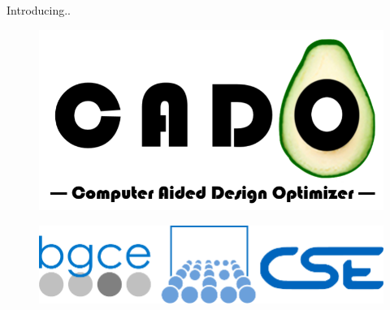 \begin{frame}{Introducing..}
	\begin{figure}
		\centering
		\includegraphics[scale=0.7]{Pictures/FirstHalf/Intro_slide.pdf}
	\end{figure}
	\begin{figure}
		\centering
		\includegraphics[scale=0.35]{Pictures/FirstHalf/sccs_os2.pdf}
	\end{figure}
\end{frame}

